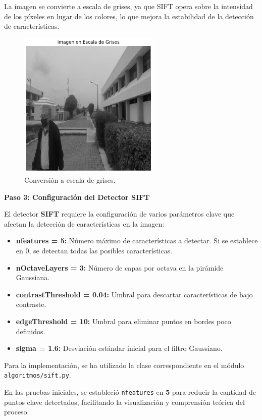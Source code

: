 \documentclass[a4paper]{article}
\begin{document}
La imagen se convierte a escala de grises, ya que SIFT opera sobre la intensidad de los píxeles en lugar de los colores, lo que mejora la estabilidad de la detección de características.

\begin{figure}[H]
    \centering
    \includegraphics[width=0.6\textwidth]{images/sift_paso_2.png}
    \caption{Conversión a escala de grises.}
\end{figure}

\textbf{Paso 3: Configuración del Detector SIFT}
\par\vspace{0.5cm}

El detector \textbf{SIFT} requiere la configuración de varios parámetros clave que afectan la detección de características en la imagen:

\begin{itemize}
    \item \textbf{nfeatures = 5:} Número máximo de características a detectar. Si se establece en 0, se detectan todas las posibles características.
    \item \textbf{nOctaveLayers = 3:} Número de capas por octava en la pirámide Gaussiana.
    \item \textbf{contrastThreshold = 0.04:} Umbral para descartar características de bajo contraste.
    \item \textbf{edgeThreshold = 10:} Umbral para eliminar puntos en bordes poco definidos.
    \item \textbf{sigma = 1.6:} Desviación estándar inicial para el filtro Gaussiano.
\end{itemize}

Para la implementación, se ha utilizado la clase correspondiente en el módulo \texttt{algoritmos/sift.py}. 
\par\vspace{0.5cm}
En las pruebas iniciales, se estableció \texttt{nfeatures} en \textbf{5} para reducir la cantidad de puntos clave detectados, 
facilitando la visualización y comprensión teórica del proceso.
\par\vspace{0.5cm}
\end{document}
